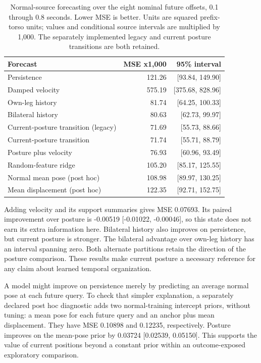 \documentclass[letterpaper]{article}
\begin{document}
\begin{table}[t]
\centering
\footnotesize
\setlength{\tabcolsep}{3pt}
\begin{tabular}{>{\raggedright\arraybackslash}p{}rr}
\toprule
Forecast & MSE x1,000 & 95\% interval \\
\midrule
Persistence & 121.26 & [93.84, 149.90] \\
Damped velocity & 575.19 & [375.68, 828.96] \\
Own-leg history & 81.74 & [64.25, 100.33] \\
Bilateral history & 80.63 & [62.73, 99.97] \\
Current-posture transition (legacy) & 71.69 & [55.73, 88.66] \\
Current-posture transition & 71.74 & [55.71, 88.79] \\
Posture plus velocity & 76.93 & [60.96, 93.49] \\
Random-feature ridge & 105.20 & [85.17, 125.55] \\
Normal mean pose (post hoc) & 108.98 & [89.97, 130.25] \\
Mean displacement (post hoc) & 122.35 & [92.71, 152.75] \\
\bottomrule
\end{tabular}
\caption{Normal-source forecasting over the eight nominal future offsets, 0.1 through 0.8 seconds. Lower MSE is better. Units are squared prefix-torso units; values and conditional source intervals are multiplied by 1,000. The separately implemented legacy and current posture transitions are both retained.}
\label{tab:forecasts}
\end{table}

Adding velocity and its support summaries gives MSE 0.07693. Its paired improvement over posture is -0.00519 [-0.01022, -0.00046], so this state does not earn its extra information here. Bilateral history also improves on persistence, but current posture is stronger. The bilateral advantage over own-leg history has an interval spanning zero. Both alternate partitions retain the direction of the posture comparison. These results make current posture a necessary reference for any claim about learned temporal organization. 

A model might improve on persistence merely by predicting an average normal pose at each future query. To check that simpler explanation, a separately declared post hoc diagnostic adds two normal-training intercept priors, without tuning: a mean pose for each future query and an anchor plus mean displacement. They have MSE 0.10898 and 0.12235, respectively. Posture improves on the mean-pose prior by 0.03724 [0.02539, 0.05150]. This supports the value of current positions beyond a constant prior within an outcome-exposed exploratory comparison.
\end{document}
